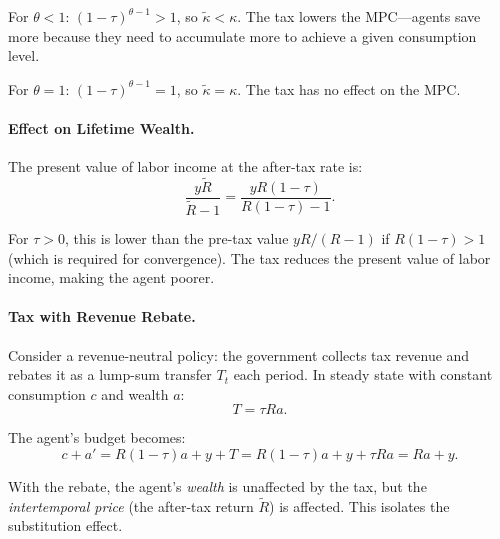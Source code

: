For $\theta < 1$: $(1 - \tau)^{\theta - 1} > 1$, so $\tilde{\kappa} < \kappa$. The tax lowers the MPC---agents save more because they need to accumulate more to achieve a given consumption level.

For $\theta = 1$: $(1 - \tau)^{\theta - 1} = 1$, so $\tilde{\kappa} = \kappa$. The tax has no effect on the MPC.

\paragraph{Effect on Lifetime Wealth.}
The present value of labor income at the after-tax rate is:
\begin{equation}
\frac{y \tilde{R}}{\tilde{R} - 1} = \frac{y R(1-\tau)}{R(1-\tau) - 1}.
\label{eq:pv-labor-tax}
\end{equation}

For $\tau > 0$, this is lower than the pre-tax value $yR/(R-1)$ if $R(1-\tau) > 1$ (which is required for convergence). The tax reduces the present value of labor income, making the agent poorer.

\paragraph{Tax with Revenue Rebate.}
Consider a revenue-neutral policy: the government collects tax revenue and rebates it as a lump-sum transfer $T_t$ each period. In steady state with constant consumption $c$ and wealth $a$:
\begin{equation}
T = \tau R a.
\label{eq:tax-revenue}
\end{equation}

The agent's budget becomes:
\begin{equation}
c + a' = R(1-\tau) a + y + T = R(1-\tau) a + y + \tau R a = Ra + y.
\label{eq:budget-rebate}
\end{equation}

With the rebate, the agent's \emph{wealth} is unaffected by the tax, but the \emph{intertemporal price} (the after-tax return $\tilde{R}$) is affected. This isolates the substitution effect.


